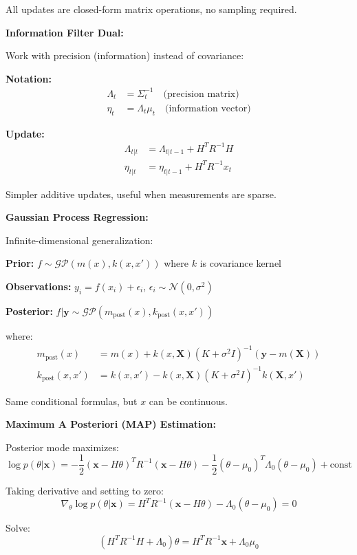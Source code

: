 \documentclass[12pt]{article}
\begin{document}
\begin{explanation}
All updates are closed-form matrix operations, no sampling required.

\textbf{Information Filter Dual:}

Work with precision (information) instead of covariance:

\textbf{Notation:}
\begin{align*}
\Lambda_t &= \Sigma_t^{-1} \quad \text{(precision matrix)} \\
\eta_t &= \Lambda_t\mu_t \quad \text{(information vector)}
\end{align*}

\textbf{Update:}
\begin{align*}
\Lambda_{t|t} &= \Lambda_{t|t-1} + H^TR^{-1}H \\
\eta_{t|t} &= \eta_{t|t-1} + H^TR^{-1}x_t
\end{align*}

Simpler additive updates, useful when measurements are sparse.

\textbf{Gaussian Process Regression:}

Infinite-dimensional generalization:

\textbf{Prior:} $f \sim \mathcal{GP}(m(x), k(x, x'))$ where $k$ is covariance kernel

\textbf{Observations:} $y_i = f(x_i) + \epsilon_i$, $\epsilon_i \sim \mathcal{N}(0, \sigma^2)$

\textbf{Posterior:} $f | \mathbf{y} \sim \mathcal{GP}(m_{\text{post}}(x), k_{\text{post}}(x, x'))$

where:
\begin{align*}
m_{\text{post}}(x) &= m(x) + k(x, \mathbf{X})(K + \sigma^2I)^{-1}(\mathbf{y} - m(\mathbf{X})) \\
k_{\text{post}}(x, x') &= k(x, x') - k(x, \mathbf{X})(K + \sigma^2I)^{-1}k(\mathbf{X}, x')
\end{align*}

Same conditional formulas, but $x$ can be continuous.

\textbf{Maximum A Posteriori (MAP) Estimation:}

Posterior mode maximizes:
\[
\log p(\theta | \mathbf{x}) = -\frac{1}{2}(\mathbf{x} - H\theta)^TR^{-1}(\mathbf{x} - H\theta) - \frac{1}{2}(\theta - \mu_0)^T\Lambda_0(\theta - \mu_0) + \text{const}
\]

Taking derivative and setting to zero:
\[
\nabla_\theta \log p(\theta | \mathbf{x}) = H^TR^{-1}(\mathbf{x} - H\theta) - \Lambda_0(\theta - \mu_0) = 0
\]

Solve:
\[
(H^TR^{-1}H + \Lambda_0)\theta = H^TR^{-1}\mathbf{x} + \Lambda_0\mu_0
\]


\end{explanation}
\end{document}
